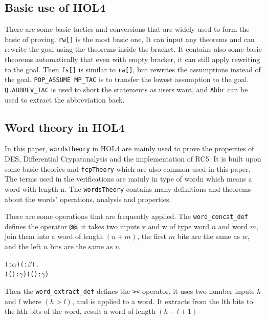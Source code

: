 \documentclass{article}
\begin{document}
\subsection{Basic use of HOL4}
There are some basic tactics and conversions that are widely used to form the basic of proving. \verb|rw[]| is the most basic one,
It can input any theorems and can rewrite the goal using the theorems inside the bracket. It contains also some basic theorems automatically that
even with empty bracker, it can still apply rewriting to the goal.
Then \verb|fs[]| is similar to \verb|rw[]|, but rewrites the assumptions instead of the goal.
\verb|POP_ASSUME MP_TAC| is to transfer the lowest assumption to the goal. \verb|Q.ABBREV_TAC| is used to short the statements as users want, and
\verb|Abbr| can be used to extract the abbreviation back.

\subsection{Word theory in HOL4}
In this paper, \verb|wordsTheory| in HOL4 are mainly used to prove the properties of DES, Differential Crypatanalysis
and the implementation of RC5. It is built upon some basic theories and \verb|fcpTheory| which are also common used in
this paper. The terms used in the verifications are mainly in type of wordn which means a word with length n.
The \verb|wordsTheory| contains many definitions and theorems about the words' operations, analysis and properties.

There are some operations that are frequently applied. The \verb|word_concat_def| defines the operator \verb|@@|, it takes two
inputs v and w of type word $n$ and word $m$, join them into a word of length $(n+m)$, the first $m$ bits are the same as $w$,
and the left $n$ bits are the same as $v$.

\begin{alltt}
\HOLTokenTurnstile{} \HOLSymConst{\HOLTokenForall{}}( :\ensuremath{\alpha} ) ( :\ensuremath{\beta} ).
     ((  ) :\ensuremath{\gamma} ) \HOLSymConst{=} ( (  ) :\ensuremath{\gamma} )
\end{alltt}

Then the \verb|word_extract_def| defines the \verb|><| operator, it uses two number inputs $h$ and $l$ where $(h>l)$, and is applied
to a word. It extracts from the lth bits to the hth bits of the word, result a word of length $(h-l+1)$
\end{document}
